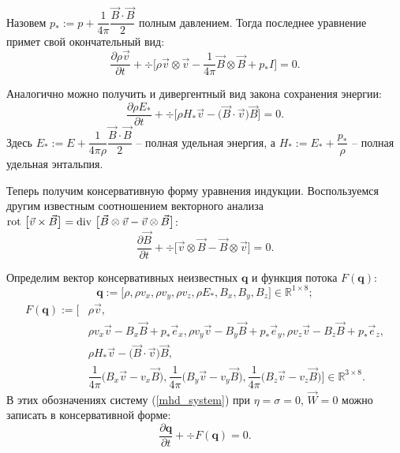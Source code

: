 \documentclass[14pt, a4paper, fleqn]{extreport}
\begin{document}
	Назовем $p_* := p + \dfrac{1}{4\pi}\dfrac{\vec{B}\cdot\vec{B}}{2}$ полным давлением.
	Тогда последнее уравнение примет свой окончательный вид:
	\begin{equation*}
		\dfrac{\partial\rho\vec{v}}{\partial t}
			+ \div{\Big[ \rho\vec{v}\otimes\vec{v} - \dfrac{1}{4\pi}\vec{B}\otimes\vec{B} 
				+ p_*I \Big]} = 0.
	\end{equation*}
	
	Аналогично можно получить и дивергентный вид закона сохранения энергии:
	\begin{equation*}
		\dfrac{\partial\rho E_*}{\partial t}
			+ \div{\Big[ \rho H_* \vec{v} 
				- \big( \vec{B} \cdot \vec{v} \big) \vec{B} \Big]} = 0.
	\end{equation*}
	Здесь $E_* := E + \dfrac{1}{4\pi\rho}\dfrac{\vec{B}\cdot\vec{B}}{2}$ -- полная удельная энергия,
	а $H_* := E_* + \dfrac{p_*}{\rho}$ -- полная удельная энтальпия.

	Теперь получим консервативную форму уравнения индукции.
	Воспользуемся другим известным соотношением векторного анализа \\
	$\text{rot }{\big[ \vec{v} \times \vec{B} \big]} 
		= \text{div }{\big[\vec{B}\otimes\vec{v}} - \vec{v}\otimes\vec{B}\big]$:
	\begin{equation*}
		\dfrac{\partial\vec{B}}{\partial t} 
			+ \div{\big[ \vec{v}\otimes\vec{B} - \vec{B}\otimes\vec{v}} \big] = 0.
	\end{equation*}

	Определим вектор консервативных неизвестных $\textbf{q}$
	и функция потока $F(\textbf{q})$:
	\begin{equation*}
		\textbf{q} := \Big[ \rho, \rho v_x, \rho v_y, \rho v_z,
		                   \rho E_*, B_x, B_y, B_z \Big] \in \mathbb{R}^{1 \times 8};     
	\end{equation*}
	\begin{equation*}
	\begin{split}
		F(\textbf{q}) := \Big[ 
			&\rho\vec{v}, \\
			&\rho v_x \vec{v} - B_x\vec{B} + p_*\vec{e}_x, 
			 \rho v_y \vec{v} - B_y\vec{B} + p_*\vec{e}_y, 
			 \rho v_z \vec{v} - B_z\vec{B} + p_*\vec{e}_z, \\
			&\rho H_* \vec{v} - \big( \vec{B} \cdot \vec{v} \big) \vec{B}, \\
			&\dfrac{1}{4\pi}\big( B_x\vec{v} - v_x\vec{B} \big), 
			 \dfrac{1}{4\pi}\big( B_y\vec{v} - v_y\vec{B} \big), 
			 \dfrac{1}{4\pi}\big( B_z\vec{v} - v_z\vec{B} \big) \Big] \in \mathbb{R}^{3 \times 8}.
	\end{split}
	\end{equation*}
	В этих обозначениях систему (\ref{mhd_system}) при $\eta = \sigma = 0$, $\vec{W} = 0$
	можно записать в консервативной форме:
	\begin{equation*}
		\dfrac{\partial \textbf{q}}{\partial t} + \div{F(\textbf{q})} = 0.
	\end{equation*}
\end{document}
